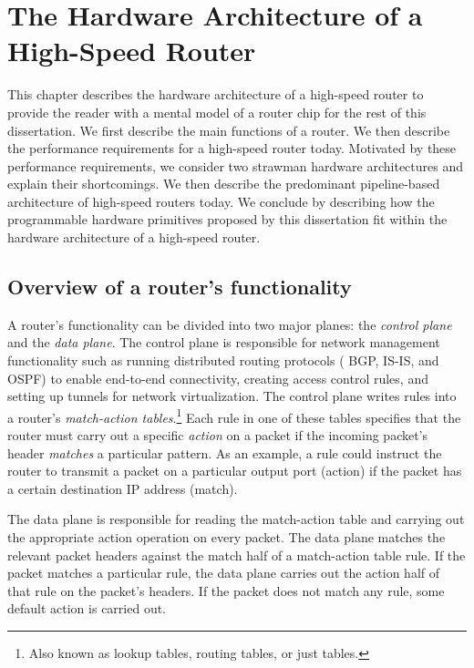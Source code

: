 \chapter{The Hardware Architecture of a High-Speed Router}
\label{chap:arch}

This chapter describes the hardware architecture of a high-speed router to
provide the reader with a mental model of a router chip for the rest of this
dissertation. We first describe the main functions of a router. We then
describe the performance requirements for a high-speed router today. Motivated
by these performance requirements, we consider two strawman hardware
architectures and explain their shortcomings. We then describe the predominant
pipeline-based architecture of high-speed routers today. We conclude by
describing how the programmable hardware primitives proposed by this
dissertation fit within the hardware architecture of a high-speed router.

\section{Overview of a router's functionality}

A router's functionality can be divided into two major planes: the {\em control
plane} and the {\em data plane}. The control plane is responsible for network
management functionality such as running distributed routing protocols (\eg
BGP, IS-IS, and OSPF) to enable end-to-end connectivity, creating access
control rules, and setting up tunnels for network virtualization. The control
plane writes rules into a router's {\em match-action tables}.\footnote{Also
known as lookup tables, routing tables, or just tables.} Each rule in one of
these tables specifies that the router must carry out a specific {\em action}
on a packet if the incoming packet's header {\em matches} a particular pattern.
As an example, a rule could instruct the router to transmit a packet on a
particular output port (action) if the packet has a certain destination IP address
(match).

The data plane is responsible for reading the match-action table and carrying
out the appropriate action operation on every packet.  The data plane matches
the relevant packet headers against the match half of a match-action table
rule. If the packet matches a particular rule, the data plane carries out the
action half of that rule on the packet's headers. If the packet does not match
any rule, some default action is carried out.

